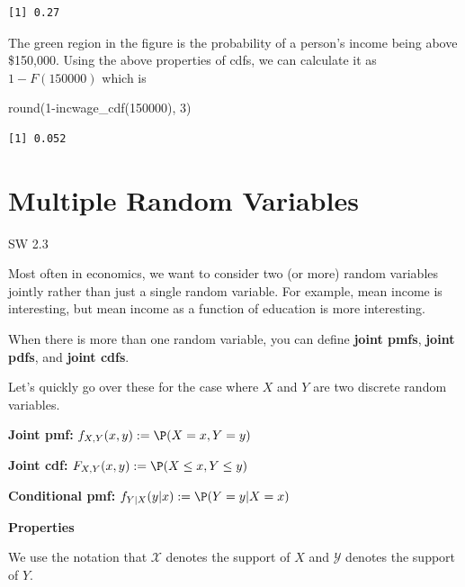 \documentclass[
  letterpaper,
  DIV=11,
  numbers=noendperiod]{scrreprt}
\newenvironment{Shaded}{\begin{snugshade}}{\end{snugshade}}
\newcommand{\DecValTok}[1]{\textcolor[rgb]{0.68,0.00,0.00}{#1}}
\newcommand{\FunctionTok}[1]{\textcolor[rgb]{0.28,0.35,0.67}{#1}}
\newcommand{\NormalTok}[1]{\textcolor[rgb]{0.00,0.23,0.31}{#1}}
\newcommand{\SpecialCharTok}[1]{\textcolor[rgb]{0.37,0.37,0.37}{#1}}
\begin{document}
\begin{verbatim}
[1] 0.27
\end{verbatim}

The green region in the figure is the probability of a person's income
being above \$150,000. Using the above properties of cdfs, we can
calculate it as \(1-F(150000)\) which is

\begin{Shaded}
\begin{Highlighting}[]
\FunctionTok{round}\NormalTok{(}\DecValTok{1}\SpecialCharTok{{-}}\FunctionTok{incwage\_cdf}\NormalTok{(}\DecValTok{150000}\NormalTok{), }\DecValTok{3}\NormalTok{)}
\end{Highlighting}
\end{Shaded}

\begin{verbatim}
[1] 0.052
\end{verbatim}

\section{Multiple Random Variables}\label{multiple-random-variables}

SW 2.3

Most often in economics, we want to consider two (or more) random
variables jointly rather than just a single random variable. For
example, mean income is interesting, but mean income as a function of
education is more interesting.

When there is more than one random variable, you can define
\textbf{joint pmfs}, \textbf{joint pdfs}, and \textbf{joint cdfs}.

Let's quickly go over these for the case where \(X\) and \(Y\) are two
discrete random variables.

\textbf{Joint pmf:} \(f_{X,Y}(x,y) := \P(X=x, Y=y)\)

\textbf{Joint cdf:} \(F_{X,Y}(x,y) := \P(X \leq x, Y \leq y)\)

\textbf{Conditional pmf:} \(f_{Y|X}(y|x) := \P(Y=y | X=x)\)

\textbf{Properties}

We use the notation that \(\mathcal{X}\) denotes the support of \(X\)
and \(\mathcal{Y}\) denotes the support of \(Y\).
\end{document}
